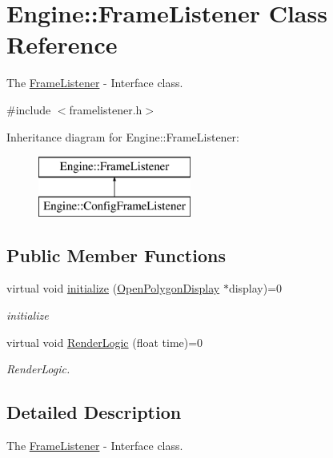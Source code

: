 \hypertarget{classEngine_1_1FrameListener}{}\section{Engine\+:\+:Frame\+Listener Class Reference}
\label{classEngine_1_1FrameListener}


The \hyperlink{classEngine_1_1FrameListener}{Frame\+Listener} -\/ Interface class.  




{\ttfamily \#include $<$framelistener.\+h$>$}

Inheritance diagram for Engine\+:\+:Frame\+Listener\+:\begin{figure}[H]
\begin{center}
\leavevmode
\includegraphics[height=2.000000cm]{classEngine_1_1FrameListener}
\end{center}
\end{figure}
\subsection*{Public Member Functions}
\begin{DoxyCompactItemize}
\item 
virtual void \hyperlink{classEngine_1_1FrameListener_abbe0d745faf156e01d2317b52f29bb48}{initialize} (\hyperlink{classEngine_1_1OpenPolygonDisplay}{Open\+Polygon\+Display} $\ast$display)=0
\begin{DoxyCompactList}\small\item\em initialize \end{DoxyCompactList}\item 
virtual void \hyperlink{classEngine_1_1FrameListener_a3e111a872dd6592c14e11d3280ce14c4}{Render\+Logic} (float time)=0
\begin{DoxyCompactList}\small\item\em Render\+Logic. \end{DoxyCompactList}\end{DoxyCompactItemize}


\subsection{Detailed Description}
The \hyperlink{classEngine_1_1FrameListener}{Frame\+Listener} -\/ Interface class. 

